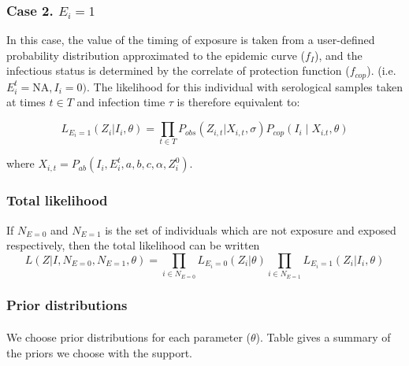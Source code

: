 \documentclass{article}
\begin{document}
\subsubsection{Case 2. $E_i = 1$}
In this case, the value of the timing of exposure is taken from a user-defined probability distribution approximated to the epidemic curve ($f_I$), and the infectious status is determined by the correlate of protection function ($f_{cop}$). (i.e. $E^t_i = \text{NA}, I_i = 0)$. The likelihood for this individual with serological samples taken at times $t\in T$ and infection time $\tau$ is therefore equivalent to:

\begin{equation}
L_{E_i = 1}(Z_{i}| I_i, \theta) = \prod_{t \in T}P_{obs}(Z_{i,t}|X_{i,t}, \sigma)P_{cop}(I_i \mid  X_{i.t}, \theta)
\end{equation}

where $X_{i,t} =P_{ab}( I_i,  E_i^t, a, b, c, \alpha, Z^0_i) $.


\subsubsection{Total likelihood}
If $N_{E=0}$ and $N_{E = 1}$ is the set of individuals which are not exposure and exposed respectively, then the total likelihood can be written 
\begin{equation}
L(Z|I, N_{E=0}, N_{E=1}, \theta) = \prod_{i \in N_{E=0}}L_{E_i = 0}(Z_{i}| \theta) \prod_{i \in N_{E=1}}L_{E_i = 1}(Z_{i}| I_i, \theta) 
\end{equation}

\subsubsection{Prior distributions}

\paragraph{}We choose prior distributions for each parameter \pi($\theta$). Table gives a summary of the priors we choose with the support. 
\end{document}
